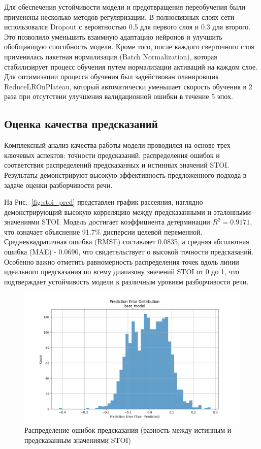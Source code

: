 \documentclass[oneside, final, 14pt]{extarticle}
\begin{document}
Для обеспечения устойчивости модели и предотвращения переобучения были применены несколько методов регуляризации. В полносвязных слоях сети использовался Dropout с вероятностью 0.5 для первого слоя и 0.3 для второго. Это позволило уменьшить взаимную адаптацию нейронов и улучшить обобщающую способность модели. Кроме того, после каждого сверточного слоя применялась пакетная нормализация (Batch Normalization), которая стабилизирует процесс обучения путем нормализации активаций на каждом слое. Для оптимизации процесса обучения был задействован планировщик ReduceLROnPlateau, который автоматически уменьшает скорость обучения в 2 раза при отсутствии улучшения валидационной ошибки в течение 5 эпох.


\subsection{Оценка качества предсказаний}

Комплексный анализ качества работы модели проводился на основе трех ключевых аспектов: точности предсказаний, распределения ошибок и соответствия распределений предсказанных и истинных значений STOI. Результаты демонстрируют высокую эффективность предложенного подхода в задаче оценки разборчивости речи.

На Рис.~\ref{fig:stoi_pred} представлен график рассеяния, наглядно демонстрирующий высокую корреляцию между предсказанными и эталонными значениями STOI. Модель достигает коэффициента детерминации $R^2 = 0.9171$, что означает объяснение 91.7\% дисперсии целевой переменной. Среднеквадратичная ошибка (RMSE) составляет 0.0835, а средняя абсолютная ошибка (MAE) - 0.0690, что свидетельствует о высокой точности предсказаний. Особенно важно отметить равномерность распределения точек вдоль линии идеального предсказания по всему диапазону значений STOI от 0 до 1, что подтверждает устойчивость модели к различным уровням разборчивости речи.

\begin{figure}[]
\centering
\includegraphics[width=0.85\linewidth]{best_model_error_dist.png}
\caption{Распределение ошибок предсказания (разность между истинным и предсказанным значениями STOI)}
\label{fig:error_dist}
\end{figure}
\end{document}
